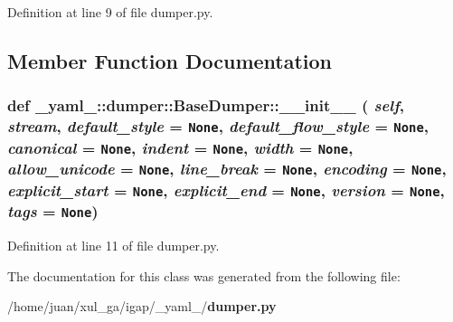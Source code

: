 Definition at line 9 of file dumper.py.

\subsection{Member Function Documentation}
\subsubsection{\setlength{\rightskip}{0pt plus 5cm}def \_\-yaml\_\-::dumper::BaseDumper::\_\-\_\-init\_\-\_\- ( {\em self},  {\em stream},  {\em default\_\-style} = {\tt None},  {\em default\_\-flow\_\-style} = {\tt None},  {\em canonical} = {\tt None},  {\em indent} = {\tt None},  {\em width} = {\tt None},  {\em allow\_\-unicode} = {\tt None},  {\em line\_\-break} = {\tt None},  {\em encoding} = {\tt None},  {\em explicit\_\-start} = {\tt None},  {\em explicit\_\-end} = {\tt None},  {\em version} = {\tt None},  {\em tags} = {\tt None})}\label{class__yaml___1_1dumper_1_1BaseDumper_c1ee1102351ed7d264aab2a5160a163f}




Definition at line 11 of file dumper.py.

The documentation for this class was generated from the following file:\begin{CompactItemize}
\item 
/home/juan/xul\_\-ga/igap/\_\-yaml\_\-/{\bf dumper.py}\end{CompactItemize}
